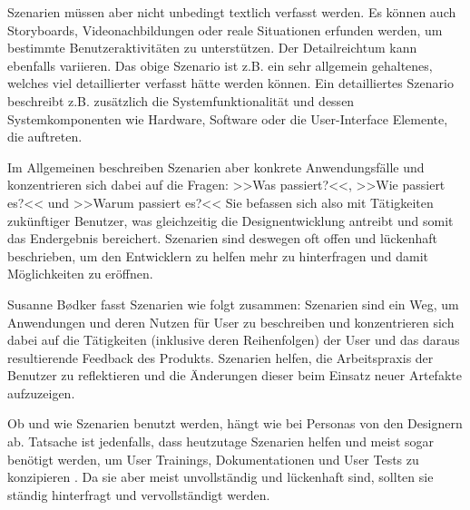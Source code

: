 \medskip Szenarien müssen aber nicht unbedingt textlich verfasst werden. Es können auch Storyboards, Videonachbildungen oder reale Situationen erfunden werden, um bestimmte Benutzeraktivitäten zu unterstützen. Der Detailreichtum kann ebenfalls variieren. Das obige Szenario ist z.B. ein sehr allgemein gehaltenes, welches viel detaillierter verfasst hätte werden können. Ein detailliertes Szenario beschreibt z.B. zusätzlich die Systemfunktionalität und dessen Systemkomponenten wie Hardware, Software oder die User-Interface Elemente, die auftreten.

\medskip Im Allgemeinen beschreiben Szenarien aber konkrete Anwendungsfälle und konzentrieren sich dabei auf die Fragen: >>Was passiert?<<, >>Wie passiert es?<< und >>Warum passiert es?<< 
Sie befassen sich also mit Tätigkeiten zukünftiger Benutzer, was gleichzeitig die Designentwicklung antreibt und somit das Endergebnis bereichert. Szenarien sind deswegen oft offen und lückenhaft beschrieben, um den Entwicklern zu helfen mehr zu hinterfragen und damit Möglichkeiten zu eröffnen. \citep{Carroll:1995}

\medskip Susanne B{\o}dker fasst Szenarien wie folgt zusammen:
Szenarien sind ein Weg, um Anwendungen und deren Nutzen für User zu beschreiben und konzentrieren sich dabei auf die Tätigkeiten (inklusive deren Reihenfolgen) der User und das daraus resultierende Feedback des Produkts. Szenarien helfen, die Arbeitspraxis der Benutzer zu reflektieren und die Änderungen dieser beim Einsatz neuer Artefakte aufzuzeigen. \citep{Bodker:1991}

\medskip Ob und wie Szenarien benutzt werden, hängt wie bei Personas von den Designern ab. Tatsache ist jedenfalls, dass heutzutage Szenarien helfen und meist sogar benötigt werden, um User Trainings, Dokumentationen und User Tests zu konzipieren \citep{Carroll:1995}. Da sie aber meist unvollständig und lückenhaft sind, sollten sie ständig hinterfragt und vervollständigt werden.
\clearpage

